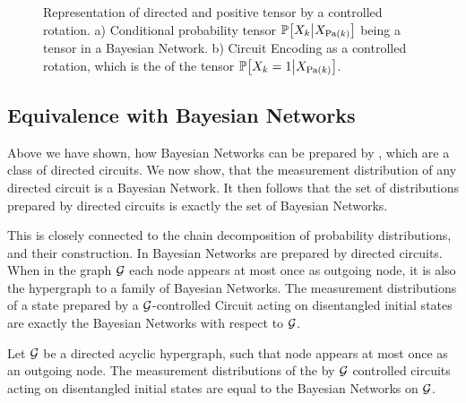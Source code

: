 \begin{figure}
    \begin{center}
        
    \end{center}
    \caption{
        Representation of directed and positive tensor by a controlled rotation.
        a) Conditional probability tensor $\mathbb{P}\big[X_{k}\big|X_{\mathrm{Pa}(k)}\big]$ being a tensor in a Bayesian Network.
        b) Circuit Encoding as a controlled rotation, which is the \ActivationCircuit{} of the tensor $\mathbb{P}\big[X_{k}=1\big|X_{\mathrm{Pa}(k)}\big]$.
    }\label{fig:cpdEncoding}
\end{figure}




\subsection{Equivalence with Bayesian Networks}

Above we have shown, how Bayesian Networks can be prepared by \activationCircuits{}, which are a class of directed circuits.
We now show, that the measurement distribution of any directed circuit is a Bayesian Network.
It then follows that the set of distributions prepared by directed circuits is exactly the set of Bayesian Networks.


This is closely connected to the chain decomposition of probability distributions, and their construction.
In \cite{low_quantum_2014} Bayesian Networks are prepared by directed circuits.
When in the graph $\mathcal{G}$ each node appears at most once as outgoing node, it is also the hypergraph to a family of Bayesian Networks.
The measurement distributions of a state prepared by a $\mathcal{G}$-controlled Circuit acting on disentangled initial states are exactly the Bayesian Networks with respect to $\mathcal{G}$.

\begin{theorem}
    \label{the:graphControlledPreparesBN}
    Let $\mathcal{G}$ be a directed acyclic hypergraph, such that node appears at most once as an outgoing node.
    The measurement distributions of the by $\mathcal{G}$ controlled circuits acting on disentangled initial states are equal to the Bayesian Networks on $\mathcal{G}$.
\end{theorem}

